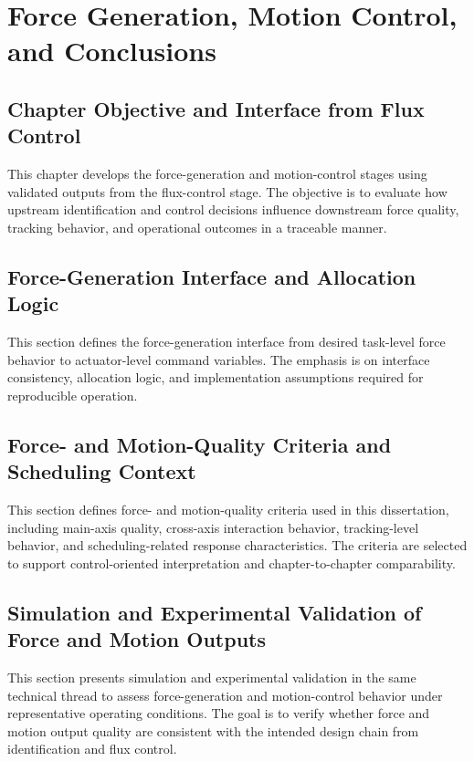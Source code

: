 \chapter{Force Generation, Motion Control, and Conclusions}

\section{Chapter Objective and Interface from Flux Control}

This chapter develops the force-generation and motion-control stages using validated outputs from the flux-control stage. The objective is to evaluate how upstream identification and control decisions influence downstream force quality, tracking behavior, and operational outcomes in a traceable manner.

\section{Force-Generation Interface and Allocation Logic}

This section defines the force-generation interface from desired task-level force behavior to actuator-level command variables. The emphasis is on interface consistency, allocation logic, and implementation assumptions required for reproducible operation.

\section{Force- and Motion-Quality Criteria and Scheduling Context}

This section defines force- and motion-quality criteria used in this dissertation, including main-axis quality, cross-axis interaction behavior, tracking-level behavior, and scheduling-related response characteristics. The criteria are selected to support control-oriented interpretation and chapter-to-chapter comparability.

\section{Simulation and Experimental Validation of Force and Motion Outputs}

This section presents simulation and experimental validation in the same technical thread to assess force-generation and motion-control behavior under representative operating conditions. The goal is to verify whether force and motion output quality are consistent with the intended design chain from identification and flux control.

